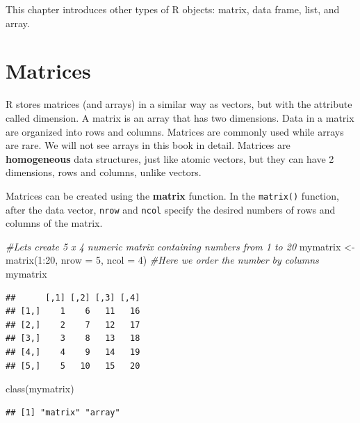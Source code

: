\documentclass[
]{book}
\newenvironment{Shaded}{\begin{snugshade}}{\end{snugshade}}
\newcommand{\AttributeTok}[1]{\textcolor[rgb]{0.77,0.63,0.00}{#1}}
\newcommand{\CommentTok}[1]{\textcolor[rgb]{0.56,0.35,0.01}{\textit{#1}}}
\newcommand{\DecValTok}[1]{\textcolor[rgb]{0.00,0.00,0.81}{#1}}
\newcommand{\FunctionTok}[1]{\textcolor[rgb]{0.00,0.00,0.00}{#1}}
\newcommand{\NormalTok}[1]{#1}
\newcommand{\OtherTok}[1]{\textcolor[rgb]{0.56,0.35,0.01}{#1}}
\newcommand{\SpecialCharTok}[1]{\textcolor[rgb]{0.00,0.00,0.00}{#1}}
\theoremstyle{definition}
\theoremstyle{definition}
\theoremstyle{definition}
\theoremstyle{definition}
\theoremstyle{remark}
\begin{document}
This chapter introduces other types of R objects: matrix, data frame, list, and array.

\hypertarget{matrices}{%
\section{Matrices}\label{matrices}}

R stores matrices (and arrays) in a similar way as vectors, but with the attribute called dimension. A matrix is an array that has two dimensions. Data in a matrix are organized into rows and columns. Matrices are commonly used while arrays are rare. We will not see arrays in this book in detail. Matrices are \textbf{homogeneous} data structures, just like atomic vectors, but they can have 2 dimensions, rows and columns, unlike vectors.

Matrices can be created using the \textbf{matrix} function. In the \texttt{matrix()} function, after the data vector, \texttt{nrow} and \texttt{ncol} specify the desired numbers of rows and columns of the matrix.

\begin{Shaded}
\begin{Highlighting}[]
\CommentTok{\#Let\textquotesingle{}s create 5 x 4 numeric matrix containing numbers from 1 to 20}
\NormalTok{mymatrix }\OtherTok{\textless{}{-}} \FunctionTok{matrix}\NormalTok{(}\DecValTok{1}\SpecialCharTok{:}\DecValTok{20}\NormalTok{, }\AttributeTok{nrow =} \DecValTok{5}\NormalTok{, }\AttributeTok{ncol =} \DecValTok{4}\NormalTok{)  }\CommentTok{\#Here we order the number by columns}
\NormalTok{mymatrix}
\end{Highlighting}
\end{Shaded}

\begin{verbatim}
##      [,1] [,2] [,3] [,4]
## [1,]    1    6   11   16
## [2,]    2    7   12   17
## [3,]    3    8   13   18
## [4,]    4    9   14   19
## [5,]    5   10   15   20
\end{verbatim}

\begin{Shaded}
\begin{Highlighting}[]
\FunctionTok{class}\NormalTok{(mymatrix)}
\end{Highlighting}
\end{Shaded}

\begin{verbatim}
## [1] "matrix" "array"
\end{verbatim}
\end{document}
